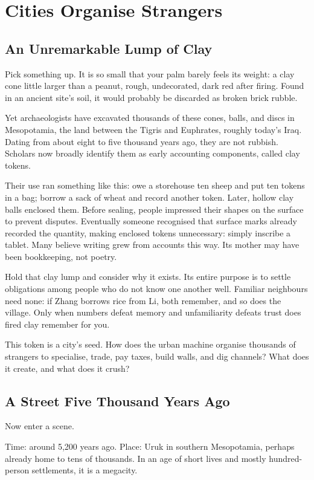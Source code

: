 \chapter{Cities Organise Strangers}
\section{An Unremarkable Lump of Clay}
Pick something up. It is so small that your palm barely feels its weight: a clay cone little larger than a peanut, rough, undecorated, dark red after firing. Found in an ancient site's soil, it would probably be discarded as broken brick rubble.

Yet archaeologists have excavated thousands of these cones, balls, and discs in Mesopotamia, the land between the Tigris and Euphrates, roughly today's Iraq. Dating from about eight to five thousand years ago, they are not rubbish. Scholars now broadly identify them as early accounting components, called clay tokens.

Their use ran something like this: owe a storehouse ten sheep and put ten tokens in a bag; borrow a sack of wheat and record another token. Later, hollow clay balls enclosed them. Before sealing, people impressed their shapes on the surface to prevent disputes. Eventually someone recognised that surface marks already recorded the quantity, making enclosed tokens unnecessary: simply inscribe a tablet. Many believe writing grew from accounts this way. Its mother may have been bookkeeping, not poetry.

Hold that clay lump and consider why it exists. Its entire purpose is to settle obligations among people who do not know one another well. Familiar neighbours need none: if Zhang borrows rice from Li, both remember, and so does the village. Only when numbers defeat memory and unfamiliarity defeats trust does fired clay remember for you.

This token is a city's seed. How does the urban machine organise thousands of strangers to specialise, trade, pay taxes, build walls, and dig channels? What does it create, and what does it crush?

\section{A Street Five Thousand Years Ago}
Now enter a scene.

Time: around 5,200 years ago. Place: Uruk in southern Mesopotamia, perhaps already home to tens of thousands. In an age of short lives and mostly hundred-person settlements, it is a megacity.

